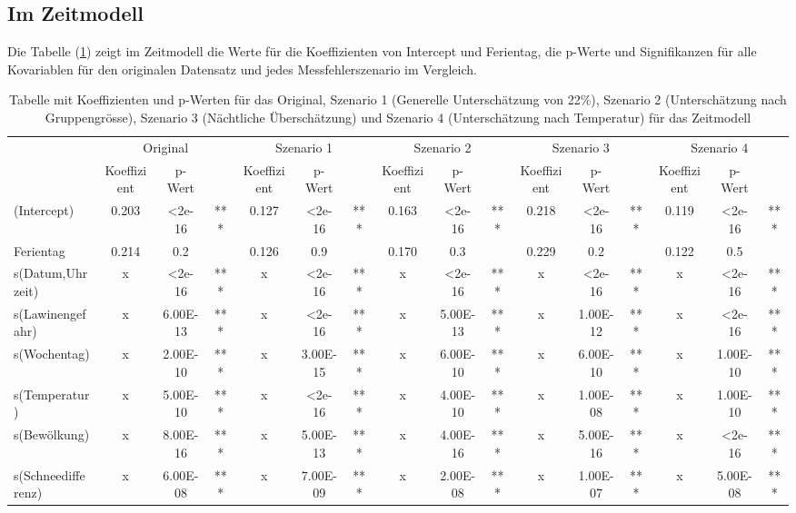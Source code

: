 \documentclass[12pt]{scrreprt}
\begin{document}
\subsection{Im Zeitmodell}
Die Tabelle (\ref{tab:Szenarien im Zeitmodell}) zeigt im Zeitmodell die Werte für die Koeffizienten von Intercept und Ferientag, die p-Werte und Signifikanzen für alle Kovariablen für den originalen Datensatz und jedes Messfehlerszenario im Vergleich. 
\begin{table}[htbp]
	\centering
	\begin{adjustbox}{max width=\textwidth}
	\begin{tabular}{l|ccc|ccc|ccc|ccc|ccc|}
		\multicolumn{1}{r}{} & \multicolumn{3}{c}{Original} & \multicolumn{3}{c}{Szenario 1} &
		\multicolumn{3}{c}{Szenario 2} & 
		\multicolumn{3}{c}{Szenario 3} & 
		\multicolumn{3}{c}{Szenario 4} \\
		& Koeffizient & p-Wert &       & Koeffizient & p-Wert &       & Koeffizient & p-Wert &       & Koeffizient & p-Wert &       & Koeffizient & p-Wert &  \\
		\cmidrule{2-16}    (Intercept) & 0.203 & <2e-16 & ***   & 0.127 & <2e-16 & ***   & 0.163 & <2e-16 & ***   & 0.218 & <2e-16 & ***   & 0.119 & <2e-16 & *** \\
		Ferientag & 0.214 & 0.2   &       & 0.126 & 0.9   &       & 0.170 & 0.3   &       & 0.229 & 0.2   &       & 0.122 & 0.5   &   \\
		s(Datum,Uhrzeit) & x     & <2e-16 & ***   & x     & <2e-16 & ***   & x     & <2e-16 & ***   & x     & <2e-16 & ***   & x     & <2e-16 & *** \\
		s(Lawinengefahr) & x     & 6.00E-13 & ***   & x     & <2e-16 & ***   & x     & 5.00E-13 & ***   & x     & 1.00E-12 & ***   & x     & <2e-16 & *** \\
		s(Wochentag) & x     & 2.00E-10 & ***   & x     & 3.00E-15 & ***   & x     & 6.00E-10 & ***   & x     & 6.00E-10 & ***   & x     & 1.00E-10 & *** \\
		s(Temperatur) & x     & 5.00E-10 & ***   & x     & <2e-16 & ***   & x     & 4.00E-10 & ***   & x     & 1.00E-08 & ***   & x     & 1.00E-10 & *** \\
		s(Bewölkung) & x     & 8.00E-16 & ***   & x     & 5.00E-13 & ***   & x     & 4.00E-16 & ***   & x     & 5.00E-16 & ***   & x     & <2e-16 & *** \\
		s(Schneedifferenz) & x     & 6.00E-08 & ***   & x     & 7.00E-09 & ***   & x     & 2.00E-08 & ***   & x     & 1.00E-07 & ***   & x     & 5.00E-08 & *** \\
		\cmidrule{2-16}    \end{tabular}%
	\end{adjustbox}
	\caption{Tabelle mit Koeffizienten und p-Werten für das Original, Szenario 1 (Generelle Unterschätzung von 22\%), Szenario 2 (Unterschätzung nach Gruppengrösse), Szenario 3 (Nächtliche Überschätzung) und Szenario 4 (Unterschätzung nach Temperatur) für das Zeitmodell}
	\label{tab:Szenarien im Zeitmodell}%
\end{table}%
\end{document}
